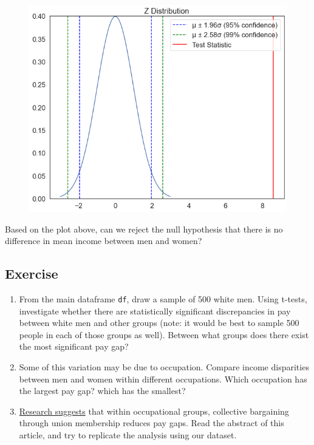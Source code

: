 \documentclass[
  letterpaper,
  DIV=11,
  numbers=noendperiod]{scrreprt}
\providecommand{\tightlist}{%
  \setlength{\itemsep}{0pt}\setlength{\parskip}{0pt}}\usepackage{longtable,booktabs,array}
\begin{document}
\begin{figure}[H]

{\centering \includegraphics{notebooks/W07. Distributions and Basic Statistics_files/figure-pdf/cell-39-output-1.png}

}

\end{figure}

Based on the plot above, can we reject the null hypothesis that there is
no difference in mean income between men and women?

\hypertarget{exercise-24}{%
\subsection{Exercise}\label{exercise-24}}

\begin{enumerate}
\def\labelenumi{\arabic{enumi}.}
\tightlist
\item
  From the main dataframe \texttt{df}, draw a sample of 500 white men.
  Using t-tests, investigate whether there are statistically significant
  discrepancies in pay between white men and other groups (note: it
  would be best to sample 500 people in each of those groups as well).
  Between what groups does there exist the most significant pay gap?
\item
  Some of this variation may be due to occupation. Compare income
  disparities between men and women within different occupations. Which
  occupation has the largest pay gap? which has the smallest?
\item
  \href{https://journals.sagepub.com/doi/abs/10.1177/0730888401028004005}{Research
  suggests} that within occupational groups, collective bargaining
  through union membership reduces pay gaps. Read the abstract of this
  article, and try to replicate the analysis using our dataset.
\end{enumerate}
\end{document}
